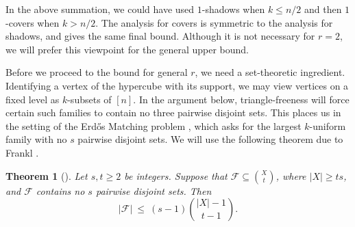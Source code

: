 \documentclass[11pt]{article}
\theoremstyle{plain}
\newtheorem{theorem}{Theorem}
\begin{document}
In the above summation, we could have used $1$-shadows when $k\le n/2$ and then $1$-covers when $k>n/2$.
The analysis for covers is symmetric to the analysis for shadows, and gives the same final bound.
Although it is not necessary for $r=2$, we will prefer this viewpoint for the general upper bound.

Before we proceed to the bound for general $r$, we need a set-theoretic ingredient.
Identifying a vertex of the hypercube with its support, we may view vertices on a fixed level as $k$-subsets of $[n]$.
In the argument below, triangle-freeness will force certain such families to contain no three pairwise disjoint sets.
This places us in the setting of the Erd\H{o}s Matching problem \cite{erdos}, which asks for the largest $k$-uniform family with no $s$ pairwise disjoint sets.
We will use the following theorem due to Frankl \cite{frankl2}.

\begin{theorem}[{\cite[Theorem~10.3, p.~22]{frankl2}}]\label{thm:frankl-matching}
Let $s,t\ge2$ be integers. Suppose that $\mathcal{F}\subseteq \binom{X}{t}$, where $|X|\ge ts$, and $\mathcal{F}$ contains no $s$ pairwise disjoint sets.
Then
\[
|\mathcal{F}|\ \le\ (s-1)\binom{|X|-1}{t-1}.
\]
\end{theorem}
\end{document}
